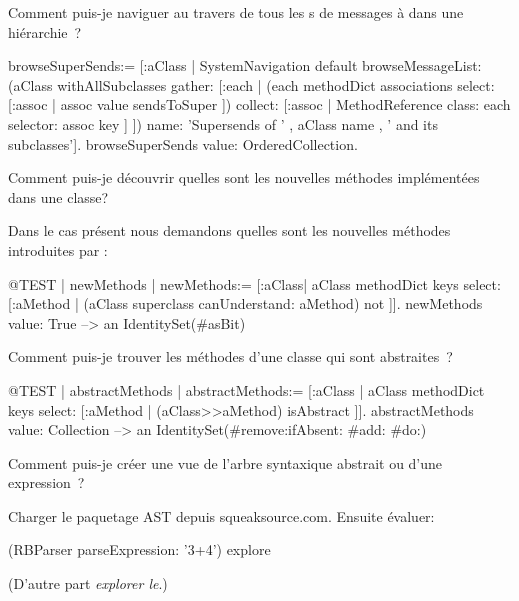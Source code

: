 \documentclass[a4paper,10pt,twoside]{book}
\begin{document}
\begin{faq}
Comment puis-je naviguer au travers de tous les 
s de messages à  dans une hiérarchie~?
\end{faq}
\answer
\begin{code}{}
browseSuperSends:= [:aClass | SystemNavigation default
	browseMessageList: (aClass withAllSubclasses gather: [:each |
		(each methodDict associations
			select: [:assoc | assoc value sendsToSuper ])
				collect: [:assoc | MethodReference class: each selector: assoc key ] ])
	name: 'Supersends of ' , aClass name , ' and its subclasses'].
browseSuperSends value: OrderedCollection.
\end{code}

\begin{faq}
Comment puis-je d\'ecouvrir quelles sont les nouvelles m\'ethodes impl\'ement\'ees dans une classe?
\end{faq}
\answer
Dans le cas pr\'esent nous demandons quelles sont les nouvelles m\'ethodes introduites par :
\begin{code}{@TEST | newMethods |}
newMethods:= [:aClass| aClass methodDict keys select:
	[:aMethod | (aClass superclass canUnderstand: aMethod) not ]].
newMethods value: True --> an IdentitySet(#asBit)
\end{code}

\begin{faq}
Comment puis-je 
trouver
les m\'ethodes d'une classe qui sont abstraites~?
\end{faq}
\answer
\begin{code}{@TEST | abstractMethods |}
abstractMethods:=
	[:aClass | aClass methodDict keys select:
		[:aMethod | (aClass>>aMethod) isAbstract ]].
abstractMethods value: Collection --> an IdentitySet(#remove:ifAbsent: #add: #do:)
\end{code}

\begin{faq}
Comment puis-je cr\'eer une vue de 
l'arbre syntaxique abstrait ou 
 d'une expression~?
\end{faq}
\answer
Charger le paquetage AST depuis squeaksource.com. Ensuite \'evaluer:
\begin{code}{}
(RBParser parseExpression: '3+4') explore
\end{code}
(D'autre part \emph{explorer le}.)
\end{document}
